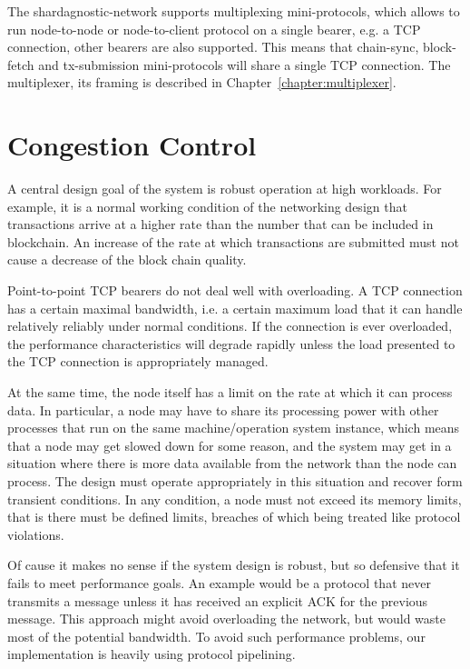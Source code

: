 The shardagnostic-network supports multiplexing mini-protocols, which allows to run
node-to-node or node-to-client protocol on a single bearer, e.g. a TCP
connection, other bearers are also supported.  This means that chain-sync,
block-fetch and tx-submission mini-protocols will share a single TCP
connection.  The multiplexer, its framing is described in
Chapter~\ref{chapter:multiplexer}.

\section{Congestion Control}
A central design goal of the system is robust operation at high workloads.  For
example, it is a normal working condition of the networking design that
transactions arrive at a higher rate than the number that can be included in
blockchain.  An increase of the rate at which transactions are submitted must
not cause a decrease of the block chain quality.

Point-to-point TCP bearers do not deal well with overloading.  A TCP connection
has a certain maximal bandwidth, i.e. a certain maximum load that it can handle
relatively reliably under normal conditions.  If the connection is ever
overloaded, the performance characteristics will degrade rapidly unless the
load presented to the TCP connection is appropriately managed.

At the same time, the node itself has a limit on the rate at which it can
process data.  In particular, a node may have to share its processing power
with other processes that run on the same machine/operation system instance,
which means that a node may get slowed down for some reason, and the system may
get in a situation where there is more data available from the network than the
node can process.  The design must operate appropriately in this situation and
recover form transient conditions.  In any condition, a node must not exceed
its memory limits, that is there must be defined limits, breaches of which
being treated like protocol violations.

Of cause it makes no sense if the system design is robust, but so defensive
that it fails to meet performance goals.  An example would be a protocol that
never transmits a message unless it has received an explicit ACK for the
previous message. This approach might avoid overloading the network, but would
waste most of the potential bandwidth.  To avoid such performance problems, our
implementation is heavily using protocol pipelining.


